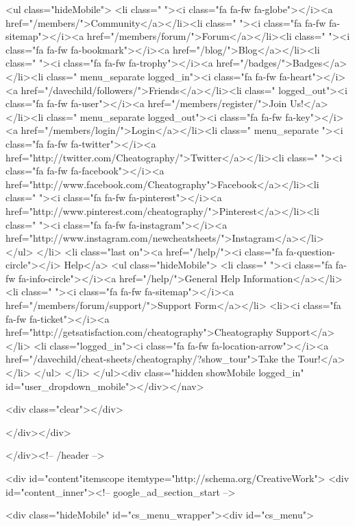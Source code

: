             		<ul class="hideMobile">
                    <li class=" "><i class="fa fa-fw fa-globe"></i><a href="/members/">Community</a></li><li class=" "><i class="fa fa-fw fa-sitemap"></i><a href="/members/forum/">Forum</a></li><li class=" "><i class="fa fa-fw fa-bookmark"></i><a href="/blog/">Blog</a></li><li class=" "><i class="fa fa-fw fa-trophy"></i><a href="/badges/">Badges</a></li><li class=" menu_separate  logged_in"><i class="fa fa-fw fa-heart"></i><a href="/davechild/followers/">Friends</a></li><li class=" logged_out"><i class="fa fa-fw fa-user"></i><a href="/members/register/">Join Us!</a></li><li class=" menu_separate  logged_out"><i class="fa fa-fw fa-key"></i><a href="/members/login/">Login</a></li><li class=" menu_separate  "><i class="fa fa-fw fa-twitter"></i><a href="http://twitter.com/Cheatography/">Twitter</a></li><li class=" "><i class="fa fa-fw fa-facebook"></i><a href="http://www.facebook.com/Cheatography">Facebook</a></li><li class=" "><i class="fa fa-fw fa-pinterest"></i><a href="http://www.pinterest.com/cheatography/">Pinterest</a></li><li class=" "><i class="fa fa-fw fa-instagram"></i><a href="http://www.instagram.com/newcheatsheets/">Instagram</a></li>                    </ul>
                </li>
                <li class="last on"><a href="/help/"><i class="fa fa-question-circle"></i> Help</a>
                    <ul class="hideMobile">
                        <li class=" "><i class="fa fa-fw fa-info-circle"></i><a href="/help/">General Help Information</a></li><li class=" "><i class="fa fa-fw fa-sitemap"></i><a href="/members/forum/support/">Support Form</a></li>                        <li><i class="fa fa-fw fa-ticket"></i><a href="http://getsatisfaction.com/cheatography">Cheatography Support</a></li>
                        <li class="logged_in"><i class="fa fa-fw fa-location-arrow"></i><a href="/davechild/cheat-sheets/cheatography/?show_tour">Take the Tour!</a></li>
                    </ul>
                </li>
            </ul><div class="hidden showMobile logged_in" id="user_dropdown_mobile"></div></nav>

            <div class="clear"></div>

        </div></div>

    </div><!-- /header -->

    <div id="content"itemscope itemtype="http://schema.org/CreativeWork">
        <div id="content_inner"><!-- google_ad_section_start -->

    
        <div class="hideMobile" id="cs_menu_wrapper"><div id="cs_menu">


